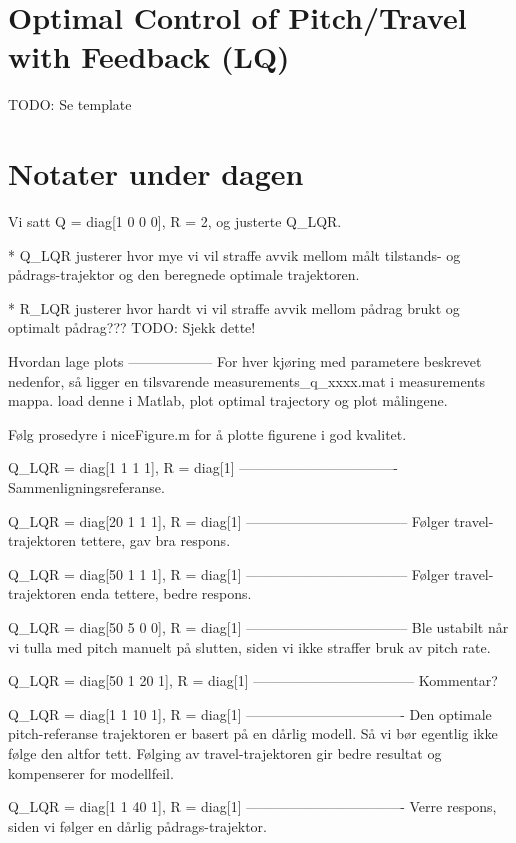 \section{Optimal Control of Pitch/Travel with Feedback (LQ)}\label{sec:prob3}
TODO: Se template


\section{Notater under dagen}
Vi satt Q = diag[1 0 0 0], R = 2, og justerte Q_LQR.

* Q_LQR justerer hvor mye vi vil straffe avvik mellom målt tilstands- og pådrags-trajektor og den beregnede optimale trajektoren.

* R_LQR justerer hvor hardt vi vil straffe avvik mellom pådrag brukt og optimalt
pådrag???
TODO: Sjekk dette!

Hvordan lage plots
------------------
For hver kjøring med parametere beskrevet nedenfor, så ligger en
tilsvarende measurements_q_xxxx.mat i measurements mappa. load
denne i Matlab, plot optimal trajectory og plot målingene.

Følg prosedyre i niceFigure.m for å plotte figurene i god kvalitet.

Q_LQR = diag[1 1 1 1], R = diag[1]
----------------------------------
Sammenligningsreferanse.

Q_LQR = diag[20 1 1 1], R = diag[1]
-----------------------------------
Følger travel-trajektoren tettere, gav bra respons.

Q_LQR = diag[50 1 1 1], R = diag[1]
-----------------------------------
Følger travel-trajektoren enda tettere, bedre respons.

Q_LQR = diag[50 5 0 0], R = diag[1]
-----------------------------------
Ble ustabilt når vi tulla med pitch manuelt på slutten, siden
vi ikke straffer bruk av pitch rate.

Q_LQR = diag[50 1 20 1], R = diag[1]
-----------------------------------
Kommentar?

Q_LQR = diag[1 1 10 1], R = diag[1]
----------------------------------
Den optimale pitch-referanse trajektoren er basert på en dårlig modell.
Så vi bør egentlig ikke følge den altfor tett. Følging av travel-trajektoren
gir bedre resultat og kompenserer for modellfeil.

Q_LQR = diag[1 1 40 1], R = diag[1]
----------------------------------
Verre respons, siden vi følger en dårlig pådrags-trajektor.
